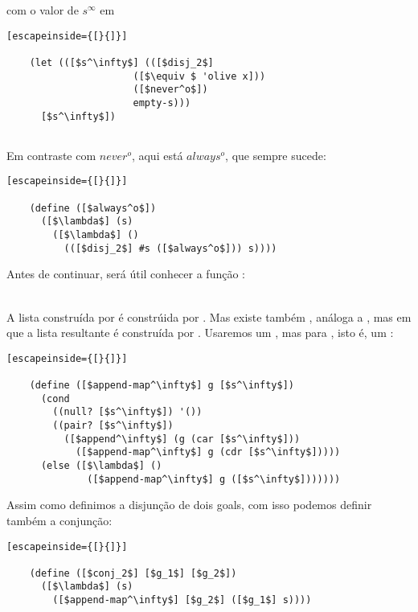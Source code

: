 \documentclass{article}
\begin{document}
  \noindent com o valor de $s^\infty$ em

  \begin{lstlisting}[escapeinside={[}{]}]

    (let (([$s^\infty$] (([$disj_2$]
                      ([$\equiv $ 'olive x]))
                      ([$never^o$])
                      empty-s)))
      [$s^\infty$])
                      
  \end{lstlisting}

  Em contraste com $never^o$, aqui está $always^o$, que sempre sucede:

  \begin{lstlisting}[escapeinside={[}{]}]

    (define ([$always^o$])
      ([$\lambda$] (s)
        ([$\lambda$] ()
          (([$disj_2$] #s ([$always^o$])) s))))

  \end{lstlisting}

  Antes de continuar, será útil conhecer a função :\\
   \seta\ 

  \noindent A lista construída por  é constrúida por
  . Mas existe também , análoga
  a , mas em que a lista resultante é construída por
  . Usaremos um , mas para
  , isto é, um :

  \begin{lstlisting}[escapeinside={[}{]}]

    (define ([$append-map^\infty$] g [$s^\infty$])
      (cond
        ((null? [$s^\infty$]) '())
        ((pair? [$s^\infty$])
          ([$append^\infty$] (g (car [$s^\infty$]))
            ([$append-map^\infty$] g (cdr [$s^\infty$]))))
      (else ([$\lambda$] ()
              ([$append-map^\infty$] g ([$s^\infty$]))))))

  \end{lstlisting}

  Assim como definimos a disjunção de dois goals, com isso podemos
  definir também a conjunção:

  \begin{lstlisting}[escapeinside={[}{]}]

    (define ([$conj_2$] [$g_1$] [$g_2$])
      ([$\lambda$] (s)
        ([$append-map^\infty$] [$g_2$] ([$g_1$] s))))

  \end{lstlisting}
\end{document}
